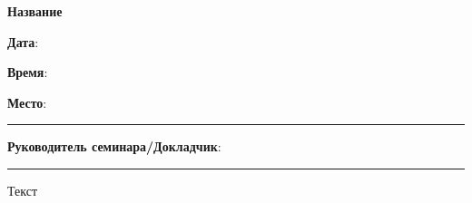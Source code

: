 \begin{center}
	\textbf{
		\fontsize{6.5cm}{7cm}\selectfont Название
	}
\end{center}        
	
	
\huge{
	\textbf{Дата}:

	\textbf{Время}:

	\textbf{Место}: 
}

\rule{\textwidth}{1pt}

\Large{
	\textbf{Руководитель семинара/Докладчик}:
}

\rule{\textwidth}{1pt}
    
\large{
	Текст
}
